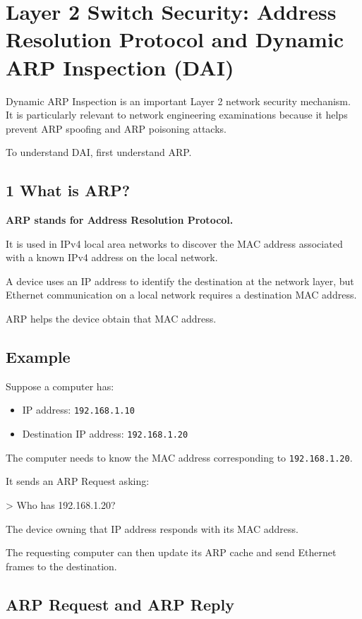 \section{Layer 2 Switch Security: Address Resolution Protocol and Dynamic ARP Inspection (DAI)}


Dynamic ARP Inspection is an important Layer 2 network security mechanism. It is particularly relevant to network engineering examinations because it helps prevent ARP spoofing and ARP poisoning attacks.

To understand DAI, first understand ARP.

\subsection{1 What is ARP?}

\textbf{ARP stands for Address Resolution Protocol.}

It is used in IPv4 local area networks to discover the MAC address associated with a known IPv4 address on the local network.

A device uses an IP address to identify the destination at the network layer, but Ethernet communication on a local network requires a destination MAC address.

ARP helps the device obtain that MAC address.

\subsection{Example}

Suppose a computer has:

\begin{itemize}
\item IP address: \texttt{192.168.1.10}
\item Destination IP address: \texttt{192.168.1.20}
\end{itemize}

The computer needs to know the MAC address corresponding to \texttt{192.168.1.20}.

It sends an ARP Request asking:

> Who has 192.168.1.20?

The device owning that IP address responds with its MAC address.

The requesting computer can then update its ARP cache and send Ethernet frames to the destination.

\subsection{ARP Request and ARP Reply}

